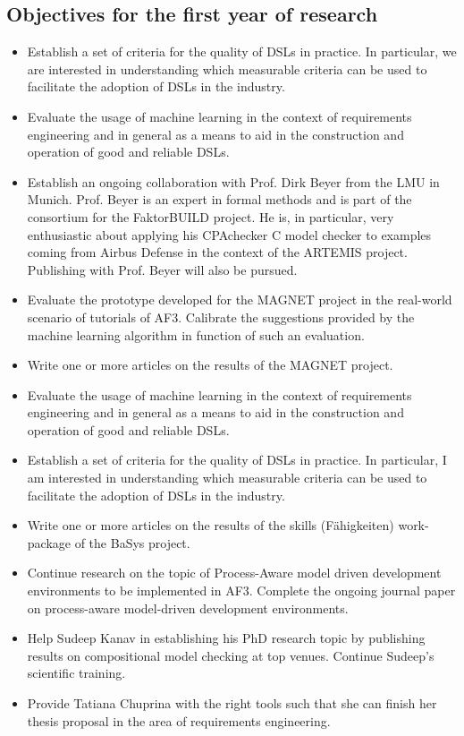 \documentclass{scrartcl}
\begin{document}
\begin{appendices}
\section{Objectives for the first year of research}
\label{app:first_year_objectives} 

\begin{itemize}
  \item Establish a set of criteria for the quality of DSLs in practice. In
  particular, we are interested in understanding which measurable criteria can
  be used to facilitate the adoption of DSLs in the industry.
  \item Evaluate the usage of machine learning in the context of requirements
  engineering and in general as a means to aid in the construction and operation
  of good and reliable DSLs.
  \item Establish an ongoing collaboration with Prof. Dirk Beyer from the LMU in
  Munich. Prof. Beyer is an expert in formal methods and is part of the
  consortium for the FaktorBUILD project. He is, in particular, very
  enthusiastic about applying his CPAchecker C model checker to examples coming
  from Airbus Defense in the context of the ARTEMIS project. Publishing with
  Prof. Beyer will also be pursued.
  \item Evaluate the prototype developed for the MAGNET project in the
  real-world scenario of tutorials of AF3. Calibrate the suggestions provided by
  the machine learning algorithm in function of such an evaluation.
  \item Write one or more articles on the results of the MAGNET project.
  \item Evaluate the usage of machine learning in the context of requirements
  engineering and in general as a means to aid in the construction and operation
  of good and reliable DSLs.
\item Establish a set of criteria for the quality of DSLs in practice. In
particular, I am interested in understanding which measurable criteria can be used to
facilitate the adoption of DSLs in the industry.
  \item Write one or more articles on the results of the skills (F\"ahigkeiten)
  work-package of the BaSys project.
 \item Continue research on the topic of Process-Aware model driven development
environments to be implemented in AF3. Complete the ongoing journal paper on
process-aware model-driven development environments.
 \item Help Sudeep Kanav in establishing his PhD research topic by publishing
 results on compositional model checking at top venues. Continue Sudeep's
 scientific training.
 \item Provide Tatiana Chuprina with the right tools such that she can finish
 her thesis proposal in the area of requirements engineering.
\end{itemize}


\end{appendices}
\end{document}
